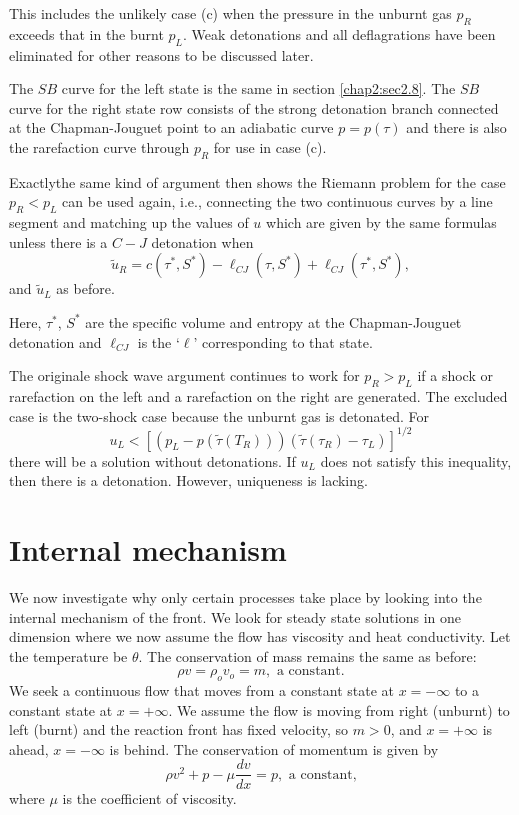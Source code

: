 This includes the unlikely case (c) when the pressure in the unburnt gas $p_R$ exceeds that in the burnt $p_L$. Weak detonations and all deflagrations have been eliminated for other reasons to be discussed later.

The $SB$ curve for the left state is the same in section \ref{chap2:sec2.8}. The $SB$ curve for the right state row consists  of the strong detonation branch connected at the Chapman-Jouguet point to an adiabatic curve $p = p(\tau)$ and there is also the rarefaction curve through $p_R$ for use in case (c).

Exactly\pageoriginale the same kind of argument then shows the Riemann problem for the case $p_R < p_L$ can be used again, i.e., connecting the two continuous curves by a line segment and matching up the values of $u$ which are given by the same formulas unless there is a $C-J$ detonation when 
$$
\tilde{u}_R = c(\tau^*, S^*) - \ell_{CJ} (\tau, S^*) + \ell_{CJ} (\tau^*, S^*),
$$
and $\tilde{u}_L$ as before.

Here, $\tau^*$, $S^*$ are the specific volume and entropy at the Chapman-Jouguet detonation and $\ell_{CJ}$ is the `$\ell$' corresponding to that state.

The originale shock wave argument continues to work for $p_R >p_L$ if a shock or rarefaction on the left and a rarefaction on the right are generated. The excluded case is the two-shock case because the unburnt gas is detonated. For 
$$
u_L < [(p_L - p(\tilde{\tau} (T_R))) (\tilde{\tau}(\tau_R) - \tau_L)]^{1/2}
$$
there will be a solution without detonations. If $u_L$ does not satisfy this inequality, then there is a detonation. However, uniqueness is lacking.

\section{Internal mechanism}\label{chap2:sec2.12}
We now investigate why only certain processes take place by looking into the internal mechanism of the front. We look for steady state solutions in one dimension where we now assume the flow has viscosity and heat conductivity. Let the temperature be $\theta$. The conservation of mass remains the same as before:
$$
\rho v = \rho_o v_o = m, \text{ a constant.}
$$\pageoriginale
We seek a continuous flow that moves from a constant state at $x = - \infty$ to a constant state at $x = + \infty$. We assume the flow is moving from right (unburnt) to left (burnt) and the reaction front has fixed velocity, so $m>0$, and $x = + \infty$ is ahead, $x = - \infty$ is behind. The conservation of momentum is given by
$$
\rho v^2 + p - \mu \frac{dv}{dx} = p, \text{ a constant,}
$$
where $\mu$ is the coefficient of viscosity.

